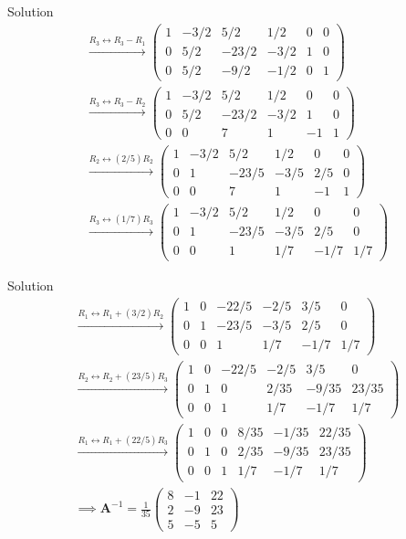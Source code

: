 \documentclass{beamer}
\numberwithin{equation}{section}
\theoremstyle{remark}
\newcommand{\myvec}[1]{\ensuremath{\begin{pmatrix}#1\end{pmatrix}}}
\let\vec\mathbf
\begin{document}
\begin{frame}{Solution}
\begin{align}
\xrightarrow{R_3 \leftrightarrow R_3 - R_1} \left(\begin{array}{ccc|ccc} 1&-3/2&5/2&1/2&0&0\\0&5/2&-23/2&-3/2&1&0\\0&5/2&-9/2&-1/2&0&1 \end{array}\right) \\
\xrightarrow{R_3 \leftrightarrow R_3 - R_2} \left(\begin{array}{ccc|ccc} 1&-3/2&5/2&1/2&0&0\\0&5/2&-23/2&-3/2&1&0\\0&0&7&1&-1&1 \end{array}\right) \\
\xrightarrow{R_2 \leftrightarrow (2/5)R_2} \left(\begin{array}{ccc|ccc} 1&-3/2&5/2&1/2&0&0\\0&1&-23/5&-3/5&2/5&0\\0&0&7&1&-1&1 \end{array}\right) \\
\xrightarrow{R_3 \leftrightarrow (1/7)R_3} \left(\begin{array}{ccc|ccc} 1&-3/2&5/2&1/2&0&0\\0&1&-23/5&-3/5&2/5&0\\0&0&1&1/7&-1/7&1/7 \end{array}\right)
\end{align}
\end{frame}

\begin{frame}{Solution}
\begin{align}
\xrightarrow{R_1 \leftrightarrow R_1 + (3/2)R_2} \left(\begin{array}{ccc|ccc} 1&0&-22/5&-2/5&3/5&0\\0&1&-23/5&-3/5&2/5&0\\0&0&1&1/7&-1/7&1/7 \end{array}\right) \\
\xrightarrow{R_2 \leftrightarrow R_2 + (23/5)R_3} \left(\begin{array}{ccc|ccc} 1&0&-22/5&-2/5&3/5&0\\0&1&0&2/35&-9/35&23/35\\0&0&1&1/7&-1/7&1/7 \end{array}\right) \\
\xrightarrow{R_1 \leftrightarrow R_1 + (22/5)R_3} \left(\begin{array}{ccc|ccc} 1&0&0&8/35&-1/35&22/35\\0&1&0&2/35&-9/35&23/35\\0&0&1&1/7&-1/7&1/7 \end{array}\right) \\
\implies \vec{A}^{-1} = \frac{1}{35}\myvec{8&-1&22\\2&-9&23\\5&-5&5}
\end{align}
\end{frame}
\end{document}
